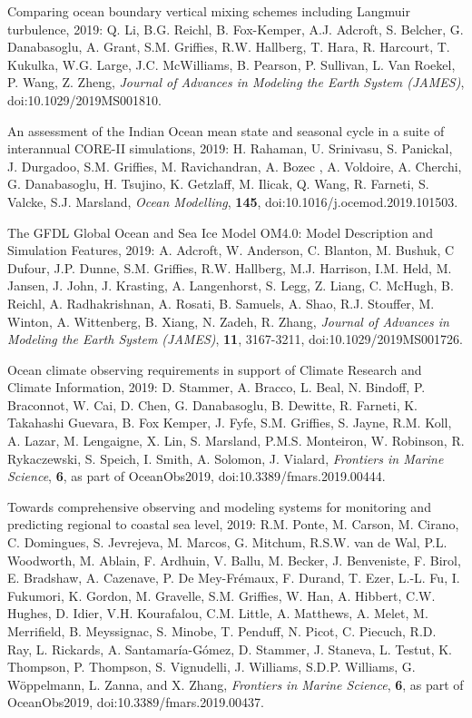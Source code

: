 \begin{etaremune}
\item Comparing ocean boundary vertical mixing schemes including Langmuir turbulence, 2019: Q. Li, B.G. Reichl,  B. Fox-Kemper, A.J. Adcroft, S. Belcher, G. Danabasoglu, A. Grant, S.M. Grif\/f\/ies, R.W. Hallberg, T. Hara, R. Harcourt, T. Kukulka, W.G. Large, J.C. McWilliams, B. Pearson, P. Sullivan, L. Van Roekel, P. Wang, Z. Zheng, {\it Journal of Advances in Modeling the Earth System (JAMES)}, doi:10.1029/2019MS001810.

\item An assessment of the Indian Ocean mean state and seasonal cycle in a suite of interannual CORE-II simulations, 2019: H. Rahaman, U. Srinivasu,  S. Panickal, J. Durgadoo, S.M. Grif\/f\/ies, M. Ravichandran, A. Bozec , A. Voldoire, A. Cherchi, G. Danabasoglu, H. Tsujino, K. Getzlaff, M. Ilicak, Q. Wang, R. Farneti, S. Valcke, S.J. Marsland, {\it Ocean Modelling}, {\bf 145},  
doi:10.1016/j.ocemod.2019.101503.



\item The GFDL Global Ocean and Sea Ice Model OM4.0: Model Description and Simulation Features, 2019: A. Adcroft, W. Anderson, C. Blanton, M. Bushuk, C Dufour, J.P. Dunne, S.M. Grif\/f\/ies, R.W. Hallberg, M.J. Harrison, I.M. Held, M.  Jansen, J. John, J. Krasting, A. Langenhorst, S. Legg, Z. Liang, C. McHugh, B. Reichl, A. Radhakrishnan, A. Rosati, B. Samuels, A. Shao, R.J. Stouffer, M. Winton, A. Wittenberg, B. Xiang, N. Zadeh, R. Zhang, {\it Journal of Advances in Modeling the Earth System (JAMES)},
{\bf 11}, 3167-3211, doi:10.1029/2019MS001726.

\item Ocean climate observing requirements in support of Climate Research and Climate Information, 2019: D. Stammer, A. Bracco, L. Beal, N. Bindoff, P. Braconnot, W. Cai, D. Chen, G. Danabasoglu, B. Dewitte, R. Farneti, K. Takahashi Guevara, B. Fox Kemper, J. Fyfe, S.M. Grif\/f\/ies, S. Jayne, R.M. Koll, A. Lazar, M. Lengaigne, X. Lin, S. Marsland, P.M.S. Monteiron, W. Robinson, R. Rykaczewski, S. Speich, I. Smith, A. Solomon, J. Vialard, {\it Frontiers in Marine Science}, {\bf 6}, as part of OceanObs2019, doi:10.3389/fmars.2019.00444.

\item Towards comprehensive observing and modeling systems for monitoring and predicting regional to coastal sea level, 2019: R.M. Ponte, M. Carson, M. Cirano, C. Domingues, S. Jevrejeva, M. Marcos, G. Mitchum, R.S.W. van de Wal, P.L. Woodworth, M. Ablain, F. Ardhuin, V. Ballu, M. Becker, J. Benveniste, F. Birol, E. Bradshaw, A. Cazenave, P. De Mey-{Fr\'{e}maux}, F. Durand, T. Ezer, L.-L. Fu, I. Fukumori, K. Gordon, M. Gravelle, S.M. Grif\/f\/ies, W. Han, A. Hibbert, C.W. Hughes, D. Idier, V.H. Kourafalou, C.M. Little, A. Matthews, A. Melet, M. Merrifield, B. Meyssignac, S. Minobe, T. Penduff, N. Picot, C. Piecuch, R.D. Ray, L. Rickards, A. Santamaría-Gómez, D. Stammer, J. Staneva, L. Testut, K. Thompson, P. Thompson, S. Vignudelli, J. Williams, S.D.P. Williams, G. {W\"{o}ppelmann}, L. Zanna, and X. Zhang, {\it Frontiers in Marine Science}, {\bf 6},  as part of 
OceanObs2019, doi:10.3389/fmars.2019.00437.


\end{etaremune}
